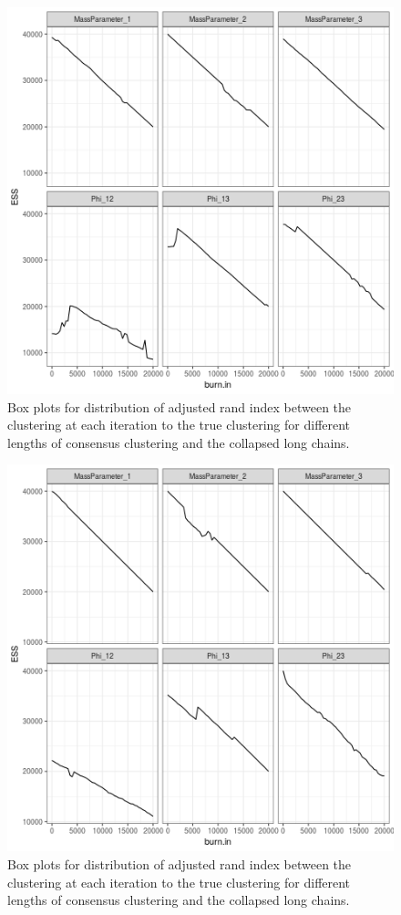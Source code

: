 \documentclass[12pt]{article} %
\begin{document}
\begin{figure}[h]
	\centering
	\includegraphics[scale=0.65]{Images/Gen_data/Case_1/Esimated_burn_in_plot_5.png}
	\caption{Box plots for distribution of adjusted rand index between the clustering at each iteration to the true clustering for different lengths of consensus clustering and the collapsed long chains.}
	\label{fig:case_1_esimated_burn_in_plot_5}
\end{figure}

\newpage

\begin{figure}[h]
	\centering
	\includegraphics[scale=0.65]{Images/Gen_data/Case_1/Esimated_burn_in_plot_6.png}
	\caption{Box plots for distribution of adjusted rand index between the clustering at each iteration to the true clustering for different lengths of consensus clustering and the collapsed long chains.}
	\label{fig:case_1_esimated_burn_in_plot_6}
\end{figure}
\end{document}
